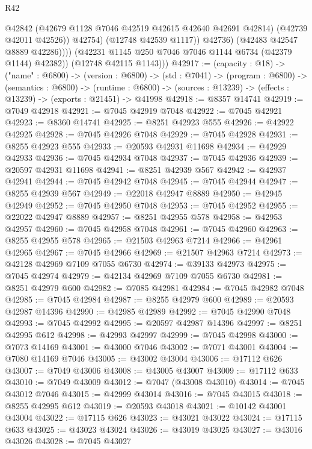 \begin{lexlean}{R42}
\begin{coremodule}
{                        @42842
                        (@42679 @1128 @7046 @42519 @42615 @42640 @42691 @42814)
                        (@42739 @42011 @42526))
                      @42754)
                    (@12748 @42539 @1117))
                  @42736)
                (@42483 @42547 @8889 @42286))))
          (@42231 @1145 @250 @7046 @7046 @1144 @6734 (@42379 @1144) @42382))
        (@12748 @42115 @1143)))
@42917 := (capacity : @18) ->
  ("name" : @6800) ->
  (version : @6800) ->
  (std : @7041) ->
  (program : @6800) ->
  (semantics : @6800) ->
  (runtime : @6800) -> (sources : @13239) -> (effects : @13239) -> (exports : @21451) -> @41998
@42918 := @8357 @14741
@42919 := @7049 @42918
@42921 := @7045 @42919 @7048
@42922 := @7045 @42921
@42923 := @8360 @14741
@42925 := @8251 @42923 @555
@42926 := @42922 @42925
@42928 := @7045 @42926 @7048
@42929 := @7045 @42928
@42931 := @8255 @42923 @555
@42933 := @20593 @42931 @11698
@42934 := @42929 @42933
@42936 := @7045 @42934 @7048
@42937 := @7045 @42936
@42939 := @20597 @42931 @11698
@42941 := @8251 @42939 @567
@42942 := @42937 @42941
@42944 := @7045 @42942 @7048
@42945 := @7045 @42944
@42947 := @8255 @42939 @567
@42949 := @22018 @42947 @8889
@42950 := @42945 @42949
@42952 := @7045 @42950 @7048
@42953 := @7045 @42952
@42955 := @22022 @42947 @8889
@42957 := @8251 @42955 @578
@42958 := @42953 @42957
@42960 := @7045 @42958 @7048
@42961 := @7045 @42960
@42963 := @8255 @42955 @578
@42965 := @21503 @42963 @7214
@42966 := @42961 @42965
@42967 := @7045 @42966
@42969 := @21507 @42963 @7214
@42973 := @42128 @42969 @7109 @7055 @6730
@42974 := @39133 @42973
@42975 := @7045 @42974
@42979 := @42134 @42969 @7109 @7055 @6730
@42981 := @8251 @42979 @600
@42982 := @7085 @42981
@42984 := @7045 @42982 @7048
@42985 := @7045 @42984
@42987 := @8255 @42979 @600
@42989 := @20593 @42987 @14396
@42990 := @42985 @42989
@42992 := @7045 @42990 @7048
@42993 := @7045 @42992
@42995 := @20597 @42987 @14396
@42997 := @8251 @42995 @612
@42998 := @42993 @42997
@42999 := @7045 @42998
@43000 := @7073 @14169
@43001 := @43000 @7046
@43002 := @7071 @43001
@43004 := @7080 @14169 @7046
@43005 := @43002 @43004
@43006 := @17112 @626
@43007 := @7049 @43006
@43008 := @43005 @43007
@43009 := @17112 @633
@43010 := @7049 @43009
@43012 := @7047 (@43008 @43010)
@43014 := @7045 @43012 @7046
@43015 := @42999 @43014
@43016 := @7045 @43015
@43018 := @8255 @42995 @612
@43019 := @20593 @43018
@43021 := @10142 @43001 @43004
@43022 := @17115 @626
@43023 := @43021 @43022
@43024 := @17115 @633
@43025 := @43023 @43024
@43026 := @43019 @43025
@43027 := @43016 @43026
@43028 := @7045 @43027
}
\end{coremodule}
\end{lexlean}
